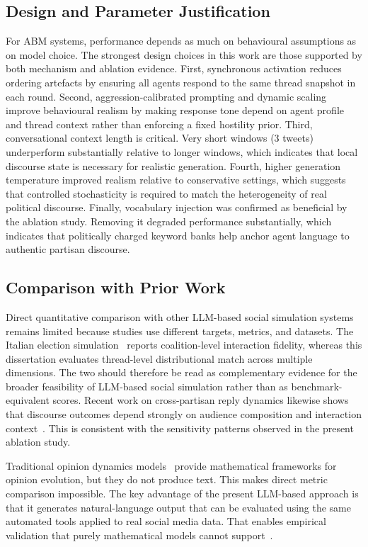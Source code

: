 \documentclass[logo,bsc,singlespacing,parskip,online]{infthesis}
\begin{document}
\subsection{Design and Parameter Justification}

For ABM systems, performance depends as much on behavioural assumptions as on model choice. The strongest design choices in this work are those supported by both mechanism and ablation evidence. First, synchronous activation reduces ordering artefacts by ensuring all agents respond to the same thread snapshot in each round. Second, aggression-calibrated prompting and dynamic scaling improve behavioural realism by making response tone depend on agent profile and thread context rather than enforcing a fixed hostility prior. Third, conversational context length is critical. Very short windows (3 tweets) underperform substantially relative to longer windows, which indicates that local discourse state is necessary for realistic generation. Fourth, higher generation temperature improved realism relative to conservative settings, which suggests that controlled stochasticity is required to match the heterogeneity of real political discourse. Finally, vocabulary injection was confirmed as beneficial by the ablation study. Removing it degraded performance substantially, which indicates that politically charged keyword banks help anchor agent language to authentic partisan discourse.

\subsection{Comparison with Prior Work}

Direct quantitative comparison with other LLM-based social simulation systems remains limited because studies use different targets, metrics, and datasets. The Italian election simulation~\citep{composta2025simulating} reports coalition-level interaction fidelity, whereas this dissertation evaluates thread-level distributional match across multiple dimensions. The two should therefore be read as complementary evidence for the broader feasibility of LLM-based social simulation rather than as benchmark-equivalent scores. Recent work on cross-partisan reply dynamics likewise shows that discourse outcomes depend strongly on audience composition and interaction context~\citep{cetinkaya2025crosspartisan}. This is consistent with the sensitivity patterns observed in the present ablation study.

Traditional opinion dynamics models~\citep{deffuant2000mixing,hegselmann2002opinion} provide mathematical frameworks for opinion evolution, but they do not produce text. This makes direct metric comparison impossible. The key advantage of the present LLM-based approach is that it generates natural-language output that can be evaluated using the same automated tools applied to real social media data. That enables empirical validation that purely mathematical models cannot support~\citep{composta2025simulating,butler2024misinformation}.
\end{document}
